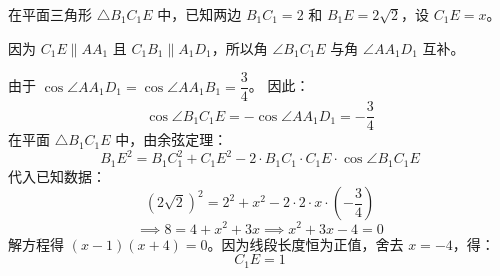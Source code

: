 \documentclass[11pt,a4paper]{ctexart}
\begin{document}
\begin{proof*}[第（3）问：求 $C_1E$ 的长度]
\begin{center}
\end{center}

在平面三角形 $\triangle B_1C_1E$ 中，已知两边 $B_1C_1 = 2$ 和 $B_1E = 2\sqrt{2}$，设 $C_1E = x$。\par
因为 $C_1E \parallel AA_1$ 且 $C_1B_1 \parallel A_1D_1$，所以角 $\angle B_1C_1E$ 与角 $\angle AA_1D_1$ 互补。\par
由于 $\cos\angle AA_1D_1 = \cos\angle AA_1B_1 = \dfrac{3}{4}$。
因此：
\[ \cos\angle B_1C_1E = -\cos\angle AA_1D_1 = -\frac{3}{4} \]
在平面 $\triangle B_1C_1E$ 中，由余弦定理：
\[ B_1E^2 = B_1C_1^2 + C_1E^2 - 2 \cdot B_1C_1 \cdot C_1E \cdot \cos\angle B_1C_1E \]
代入已知数据：
\[ (2\sqrt{2})^2 = 2^2 + x^2 - 2 \cdot 2 \cdot x \cdot \left(-\frac{3}{4}\right) \]
\[ \implies 8 = 4 + x^2 + 3x \implies x^2 + 3x - 4 = 0 \]
解方程得 $(x-1)(x+4) = 0$。因为线段长度恒为正值，舍去 $x = -4$，得：
\[ \boxed{C_1E = 1} \]
\end{proof*}
\end{document}

